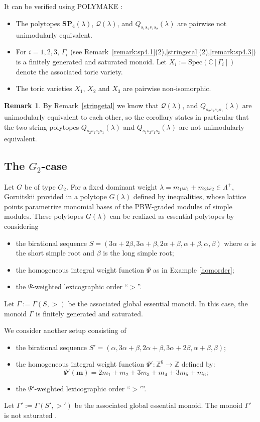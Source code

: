 \documentclass{emsprocart}
\theoremstyle{definition}
\newtheorem{remark}[theorem]{Remark}
\begin{document}
It can be verified using POLYMAKE \cite{GJ}:
\begin{itemize}
\item The polytopes $\mathbf{SP}_4(\lambda)$, $\mathcal{Q}(\lambda)$, and $Q_{s_1s_2s_1s_2}(\lambda)$ are 
pairwise not unimodularly equivalent.
\item For $i=1,2,3$, $\Gamma_i$ (see Remark~\ref{remark:sp4.1}(2),\ref{stringetal}(2),\ref{remark:sp4.3}) is a finitely generated and saturated monoid. Let $X_i:=\text{Spec}(\mathbb{C}[\Gamma_i])$ denote the associated toric variety.
\item The toric varieties $X_1$, $X_2$ and $X_3$ are pairwise non-isomorphic.
\end{itemize}

\begin{remark}
By Remark~\ref{stringetal} we know that $\mathcal{Q}(\lambda)$, and $Q_{s_2s_1s_2s_1}(\lambda)$ are unimodularly equivalent to each other,
so the corollary states in particular that the two string polytopes $Q_{s_2s_1s_2s_1}(\lambda)$ and $Q_{s_1s_2s_1s_2}(\lambda)$ are not unimodularly equivalent.
\end{remark}

\subsection{The \texorpdfstring{$G_2$-case}{G2-case}}
Let $G$ be of type $G_2$. For a fixed dominant weight $\lambda=m_1\omega_1+m_2\omega_2\in\Lambda^+$, Gornitskii provided in \cite{G} a polytope $G(\lambda)$ defined by inequalities, whose lattice points parametrize monomial bases of the PBW-graded modules of simple modules. These polytopes $G(\lambda)$ can be realized as essential polytopes by considering
\begin{itemize}
\item the birational sequence $S=(3\alpha+2\beta, 3\alpha+\beta, 2\alpha+\beta, \alpha+\beta, \alpha, \beta)$ where $\alpha$ is the short simple root and $\beta$ is the long simple root;
\item the homogeneous integral weight function $\Psi$ as in Example \ref{homorder};
\item the $\Psi$-weighted lexicographic order ``$>$''.
\end{itemize}
Let $\Gamma:=\Gamma(S,>)$ be the associated global essential monoid. In this case, the monoid $\Gamma$ is finitely generated and saturated.
\par
We consider another setup consisting of
\begin{itemize}
\item the birational sequence $S'=(\alpha, 3\alpha+\beta, 2\alpha+\beta, 3\alpha+2\beta, \alpha+\beta, \beta)$;
\item the homogeneous integral weight function $\Psi':\mathbb{Z}^6\rightarrow\mathbb{Z}$ defined by:
$$
\Psi'(\mathbf m)=2m_1+m_2+3m_3+m_4+3m_5+m_6;
$$
\item the $\Psi'$-weighted lexicographic order ``$>'$''.
\end{itemize}
Let $\Gamma':=\Gamma(S',>')$ be the associated global essential monoid. The monoid $\Gamma'$ is not saturated \cite{BFF}.
\end{document}
